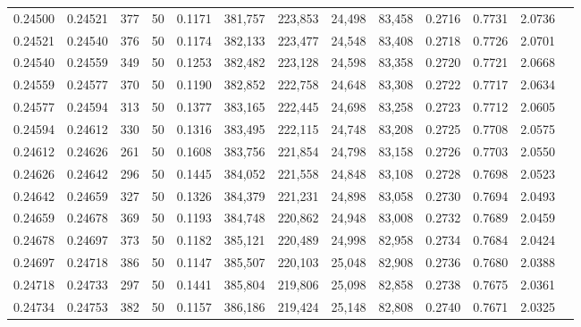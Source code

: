\begin{tabular}{rrrrrrrrrrrrr}
0.24500 & 0.24521 &   377 &  50 &                                     0.1171 & 381,757 & 223,853 &  24,498 &  83,458 & 0.2716 & 0.7731 & 2.0736 \\
0.24521 & 0.24540 &   376 &  50 &                                     0.1174 & 382,133 & 223,477 &  24,548 &  83,408 & 0.2718 & 0.7726 & 2.0701 \\
0.24540 & 0.24559 &   349 &  50 &                                     0.1253 & 382,482 & 223,128 &  24,598 &  83,358 & 0.2720 & 0.7721 & 2.0668 \\
0.24559 & 0.24577 &   370 &  50 &                                     0.1190 & 382,852 & 222,758 &  24,648 &  83,308 & 0.2722 & 0.7717 & 2.0634 \\
0.24577 & 0.24594 &   313 &  50 &                                     0.1377 & 383,165 & 222,445 &  24,698 &  83,258 & 0.2723 & 0.7712 & 2.0605 \\
0.24594 & 0.24612 &   330 &  50 &                                     0.1316 & 383,495 & 222,115 &  24,748 &  83,208 & 0.2725 & 0.7708 & 2.0575 \\
0.24612 & 0.24626 &   261 &  50 &                                     0.1608 & 383,756 & 221,854 &  24,798 &  83,158 & 0.2726 & 0.7703 & 2.0550 \\
0.24626 & 0.24642 &   296 &  50 &                                     0.1445 & 384,052 & 221,558 &  24,848 &  83,108 & 0.2728 & 0.7698 & 2.0523 \\
0.24642 & 0.24659 &   327 &  50 &                                     0.1326 & 384,379 & 221,231 &  24,898 &  83,058 & 0.2730 & 0.7694 & 2.0493 \\
0.24659 & 0.24678 &   369 &  50 &                                     0.1193 & 384,748 & 220,862 &  24,948 &  83,008 & 0.2732 & 0.7689 & 2.0459 \\
0.24678 & 0.24697 &   373 &  50 &                                     0.1182 & 385,121 & 220,489 &  24,998 &  82,958 & 0.2734 & 0.7684 & 2.0424 \\
0.24697 & 0.24718 &   386 &  50 &                                     0.1147 & 385,507 & 220,103 &  25,048 &  82,908 & 0.2736 & 0.7680 & 2.0388 \\
0.24718 & 0.24733 &   297 &  50 &                                     0.1441 & 385,804 & 219,806 &  25,098 &  82,858 & 0.2738 & 0.7675 & 2.0361 \\
0.24734 & 0.24753 &   382 &  50 &                                     0.1157 & 386,186 & 219,424 &  25,148 &  82,808 & 0.2740 & 0.7671 & 2.0325 \\

\end{tabular}
